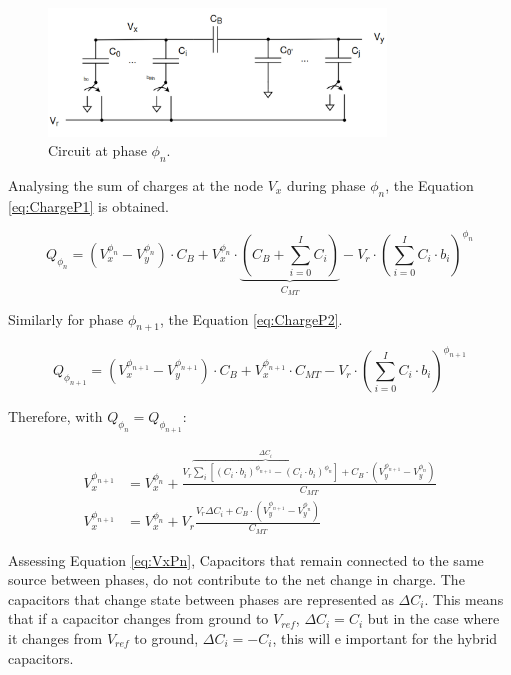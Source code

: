 \begin{figure}[H]

    \centering
    \includegraphics*[width=0.8\textwidth]{Images/DACCircPn.png}
    \caption{Circuit at phase $\phi_n$.}

    \label{fig:P1_Circ}
\end{figure}


Analysing the sum of charges at the node $V_x$ during phase $\phi_n$, the Equation \ref{eq:ChargeP1} is obtained.

\begin{equation}
    Q_{\phi_n} = (V_x^{\phi_n}-V_y^{\phi_n})\cdot C_B + V_x^{\phi_n}\cdot \underbrace{ \left ( C_B + \sum_{i=0}^{I}C_i \right )}_{C_{MT}}-V_r\cdot \left ( \sum_{i=0}^{I} C_i\cdot b_i \right )^{\phi_n}
    \label{eq:ChargeP1}
\end{equation}

Similarly for phase $\phi_{n+1}$, the Equation \ref{eq:ChargeP2}.

\begin{equation}
    Q_{\phi_{n+1}} = (V_x^{\phi_{n+1}}-V_y^{\phi_{n+1}})\cdot C_B + V_x^{\phi_{n+1}}\cdot C_{MT}-V_r\cdot \left ( \sum_{i=0}^{I} C_i\cdot b_i \right )^{\phi_{n+1}}
    \label{eq:ChargeP2}
\end{equation}

Therefore, with $Q_{\phi_{n}}=Q_{\phi_{n+1}}$:

\begin{equation}
    \begin{split}
        V_x^{\phi_{n+1}} &= V_x^{\phi_{n}} +  \frac{ V_r\overbrace{\sum_{i}\left[ (C_i\cdot b_i)^{\phi_{n+1}} - (C_i\cdot b_i)^{\phi_{n}}\right]}^{\Delta C_i}+C_B\cdot \left(V_y^{\phi_{n+1}}-V_y^{\phi_{n}}\right)}{C_{MT}} \\
        V_x^{\phi_{n+1}} &= V_x^{\phi_{n}} + V_r \frac{ V_r \Delta C_i +C_B\cdot \left(V_y^{\phi_{n+1}}-V_y^{\phi_{n}}\right)}{C_{MT}}
    \end{split}
    \label{eq:VxPn}
\end{equation}

Assessing Equation \ref{eq:VxPn}, Capacitors that remain connected to the same source between phases, do not contribute to the net change in charge. The capacitors that change state between phases are represented as $\Delta C_i$. This means that if a capacitor changes from ground to $V_{ref}$, $\Delta C_i = C_i$ but in the case where it changes from $V_{ref}$ to ground,  $\Delta C_i = -C_i$, this will e important for the hybrid capacitors.

